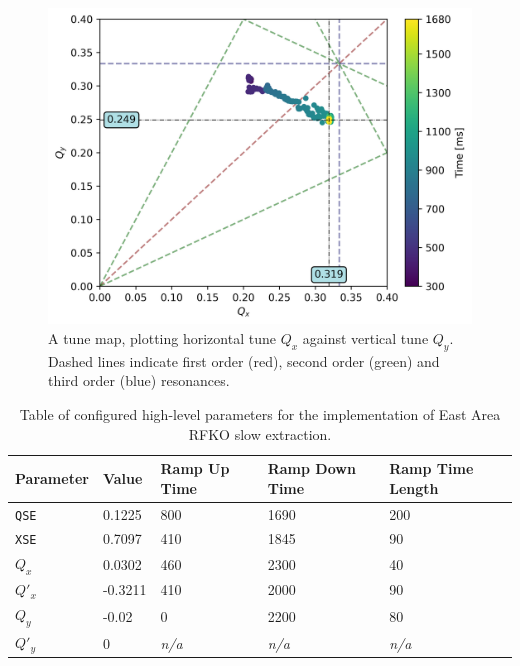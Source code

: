 \documentclass[11pt]{report}
\begin{document}
\begin{figure}
  \centering
  \includegraphics[width=0.6\linewidth]{tunemap.png}
  \caption{A tune map, plotting horizontal tune $Q_x$ against vertical tune $Q_y$. Dashed lines indicate first order (red), second order (green) and third order (blue) resonances.}\label{fig:tunemap}
\end{figure}

\begin{center}
  \centering
  \begin{table}[]
    \centering
    \begin{tabular}{lllll}
    Parameter & Value   & Ramp Up Time & Ramp Down Time & Ramp Time Length \\ \hline\hline
    \verb|QSE|& 0.1225  & 800          & 1690           & 200              \\
    \verb|XSE|& 0.7097  & 410          & 1845           & 90               \\
    $Q_x$     & 0.0302  & 460          & 2300           & 40               \\
    $Q'_x$    & -0.3211 & 410          & 2000           & 90               \\
    $Q_y$     & -0.02   & 0            & 2200           & 80               \\
    $Q'_y$    & 0       & \textit{n/a} & \textit{n/a}   & \textit{n/a}     \\
    \end{tabular}
    \caption{Table of configured high-level parameters for the implementation of East Area RFKO slow extraction.}\label{tab:params}
    \end{table}
\end{center}
\end{document}
